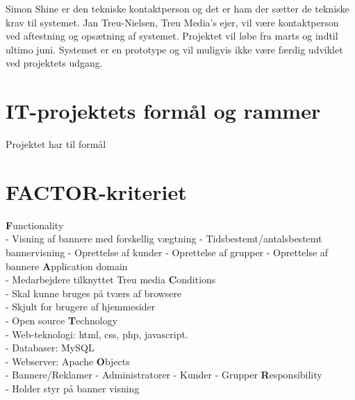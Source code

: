 \documentclass[a4paper,12pt]{article}
\begin{document}
Simon Shine er den tekniske kontaktperson og det er ham der sætter de tekniske krav til systemet. Jan Treu-Nielsen, Treu Media's ejer, vil være kontaktperson ved aftestning og opsætning af systemet. Projektet vil løbe fra marts og indtil ultimo juni. Systemet er en prototype og vil muligvis ikke være færdig udviklet ved projektets udgang. 

\section{IT-projektets formål og rammer}

Projektet har til formål 

\newpage

\section{FACTOR-kriteriet}

\large{\bf{F}}\normalsize{unctionality
\\
- Visning af bannere med forskellig vægtning
\newline
- Tidsbestemt/antalsbestemt bannervisning 
\newline
- Oprettelse af kunder 
\newline
- Oprettelse af grupper
\newline
- Oprettelse af bannere}
\newline
\newline
\large{\bf{A}}\normalsize{pplication domain
\\
- Medarbejdere tilknyttet Treu media}
\newline
\newline
\large{\bf{C}}\normalsize{onditions\\
- Skal kunne bruges på tværs af browsere\\
- Skjult for brugere af hjemmesider\\
- Open source}
\newline
\newline
\large{\bf{T}}\normalsize{echnology\\
- Web-teknologi: html, css, php, javascript.\\
- Databaser: MySQL\\
- Webserver: Apache}
\newline
\newline
\large{\bf{O}}\normalsize{bjects\\
- Bannere/Reklamer
\newline
- Administratorer
\newline
- Kunder
\newline
- Grupper}
\newline
\newline
\large{\bf{R}}\normalsize{esponsibility\\
- Holder styr på banner visning}
\end{document}
